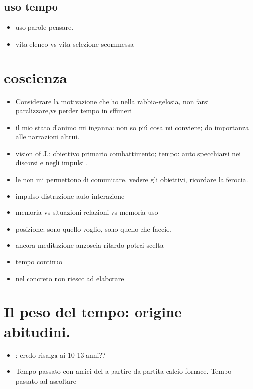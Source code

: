 \subsection{uso tempo}

\begin{itemize}
\item uso parole pensare.
\item vita elenco vs vita selezione scommessa
\end{itemize}

\section{coscienza}

\begin{itemize}
\item Considerare la motivazione che ho nella rabbia-gelosia, non farsi paralizzare,vs perder tempo in effimeri
\item il mio stato d'animo mi inganna: non so pi\'u cosa mi conviene; do importanza alle narrazioni altrui.
\item vision of J.: obiettivo primario combattimento; tempo: auto specchiarsi nei discorsi e negli impulsi .
\item le  non mi permettono di comunicare, vedere gli obiettivi, ricordare la ferocia.
\item impulso  distrazione auto-interazione 
\item memoria  vs  situazioni relazioni vs memoria uso
\item posizione: sono quello voglio, sono quello che faccio.
\item ancora meditazione angoscia ritardo potrei scelta
\item tempo continuo
\item nel concreto non riesco ad elaborare
\end{itemize}

\section{Il peso del tempo: origine abitudini.}

\begin{itemize}
\item {}: credo risalga ai 10-13 anni??
\item Tempo passato con amici del  a partire da partita calcio fornace.
Tempo passato ad ascoltare - .
\end{itemize}

